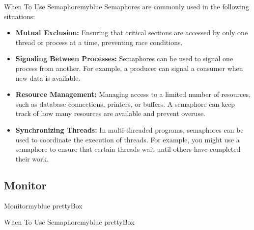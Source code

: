 \vspace{0.35cm}
\begin{prettyBox}{When To Use Semaphore}{myblue}
Semaphores are commonly used in the following situations:

\begin{itemize}
    \item \textbf{Mutual Exclusion:} Ensuring that critical sections are accessed by only one thread or process at a time, preventing race conditions.
    \item \textbf{Signaling Between Processes:} Semaphores can be used to signal one process from another. For example, a producer can signal a consumer when new data is available.
    \item \textbf{Resource Management:} Managing access to a limited number of resources, such as database connections, printers, or buffers. A semaphore can keep track of how many resources are available and prevent overuse.
    \item \textbf{Synchronizing Threads:} In multi-threaded programs, semaphores can be used to coordinate the execution of threads. For example, you might use a semaphore to ensure that certain threads wait until others have completed their work.
\end{itemize}
\end{prettyBox}

\subsection{Monitor}
\begin{prettyBox}{Monitor}{myblue}
    prettyBox
\end{prettyBox}

\begin{prettyBox}{When To Use Semaphore}{myblue}
    prettyBox
\end{prettyBox}


